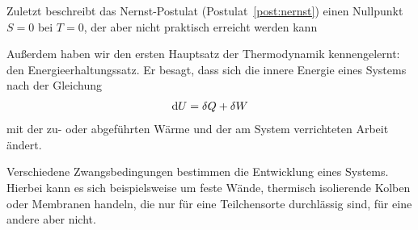 \begin{summary}
    Zuletzt beschreibt das Nernst-Postulat (Postulat~\ref{post:nernst}) einen Nullpunkt $S=0$ bei $T=0$, der aber nicht praktisch erreicht werden kann



    Außerdem haben wir den ersten Hauptsatz der Thermodynamik kennengelernt: den Energieerhaltungssatz. Er besagt, dass sich die innere Energie eines Systems nach der Gleichung 
    \begin{align*}
        \mathop{}\!\mathrm{d} U = \mathop{}\!\delta Q + \mathop{}\!\delta W
    \end{align*}
    mit der zu- oder abgeführten Wärme und der am System verrichteten Arbeit ändert. 


    Verschiedene Zwangsbedingungen bestimmen die Entwicklung eines Systems. Hierbei kann es sich beispielsweise um feste Wände, thermisch isolierende Kolben oder Membranen handeln, die nur für eine Teilchensorte durchlässig sind, für eine andere aber nicht. 
\end{summary}